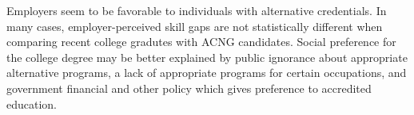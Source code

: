 \documentclass[review]{elsarticle}
\begin{document}
Employers seem to be favorable to individuals with alternative credentials.
In many cases, employer-perceived skill gaps are not statistically different when comparing recent college gradutes with ACNG candidates.
Social preference for the college degree may be better explained by public ignorance about appropriate alternative programs,
a lack of appropriate programs for certain occupations,
and government financial and other policy which gives preference to accredited education.



\end{document}
